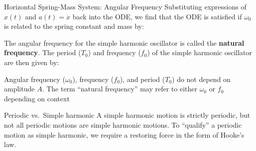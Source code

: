 \documentclass[12pt,compress,aspectratio=169]{beamer}
\begin{document}
\begin{frame}{Horizontal Spring-Mass System: Angular Frequency}
  Substituting expressions of $x(t)$ and $a(t)=\ddot x$ back into the ODE, we
  find that the ODE is satisfied if $\omega_0$ is related to the spring
  constant and mass by:


  The angular frequency for the simple harmonic oscillator is called the
  \textbf{natural frequency}. The period ($T_0$) and frequency ($f_0$) of the
  simple harmonic oscillator are then given by:

  
  Angular frequency ($\omega_0$), frequency ($f_0$), and period ($T_0$) do not
  depend on amplitude $A$.
  The term ``natural frequency'' may refer to either $\omega_0$ or $f_0$
  depending on context
\end{frame}



\begin{frame}{Periodic vs.\ Simple harmonic}
  A simple harmonic motion is strictly periodic, but not all periodic motions
  are simple harmonic motions. To ``qualify'' a periodic motion as simple
  harmonic, we require a restoring force in the form of Hooke's law.
\end{frame}
\end{document}
